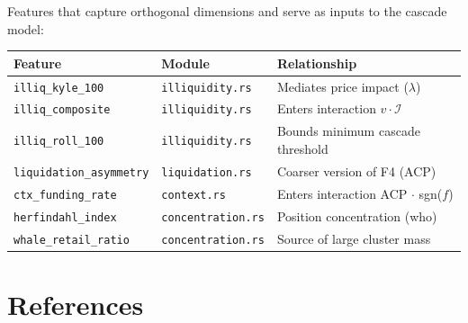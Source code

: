 \documentclass[11pt,a4paper]{article}
\begin{document}
Features that capture orthogonal dimensions and serve as inputs to the cascade model:

\begin{center}
\begin{tabular}{lll}
\toprule
\textbf{Feature} & \textbf{Module} & \textbf{Relationship} \\
\midrule
\texttt{illiq\_kyle\_100} & \texttt{illiquidity.rs} & Mediates price impact ($\lambda$) \\
\texttt{illiq\_composite} & \texttt{illiquidity.rs} & Enters interaction $v \cdot \mathcal{I}$ \\
\texttt{illiq\_roll\_100} & \texttt{illiquidity.rs} & Bounds minimum cascade threshold \\
\texttt{liquidation\_asymmetry} & \texttt{liquidation.rs} & Coarser version of F4 (ACP) \\
\texttt{ctx\_funding\_rate} & \texttt{context.rs} & Enters interaction ACP $\cdot$ sgn($f$) \\
\texttt{herfindahl\_index} & \texttt{concentration.rs} & Position concentration (who) \\
\texttt{whale\_retail\_ratio} & \texttt{concentration.rs} & Source of large cluster mass \\
\bottomrule
\end{tabular}
\end{center}

\section*{References}
\end{document}
